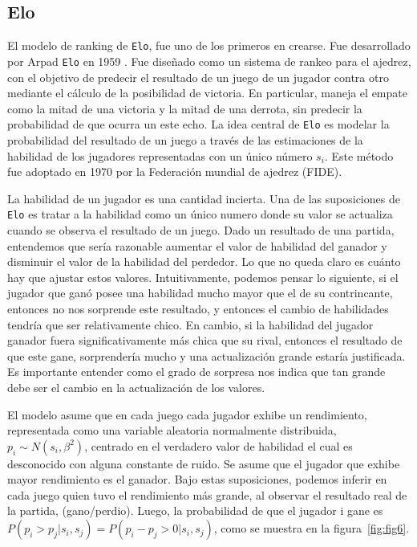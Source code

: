 \documentclass[11pt,twoside, spanish]{report} %
\begin{document}
\subsection{Elo}
El modelo de ranking de \texttt{Elo}, fue uno de los primeros en crearse. Fue desarrollado por Arpad \texttt{Elo} en 1959 \cite{elo1961-uscf}.
Fue dise\~nado como un sistema de rankeo para el ajedrez, con el objetivo de predecir el resultado de un juego de un jugador contra otro mediante el c\'alculo de la posibilidad de victoria.
En particular, maneja el empate como la mitad de una victoria y la mitad de una derrota, sin predecir la probabilidad de que ocurra un este echo.
La idea central de \texttt{Elo} es modelar la probabilidad del resultado de un juego a trav\'es de las estimaciones de la habilidad de los jugadores representadas con un \'unico n\'umero $s_i$.
Este m\'etodo fue adoptado en 1970 por la Federaci\'on mundial de ajedrez (FIDE).


La habilidad de un jugador es una cantidad incierta.
Una de las suposiciones de \texttt{Elo} es tratar a la habilidad como un \'unico numero donde su valor se actualiza cuando se observa el resultado de un juego.
Dado un resultado de una partida, entendemos que ser\'ia razonable aumentar el valor de habilidad del ganador y disminuir el valor de la habilidad del perdedor.
Lo que no queda claro es cu\'anto hay que ajustar estos valores.
Intuitivamente, podemos pensar lo siguiente, si el jugador que gan\'o posee una habilidad mucho mayor que el de su contrincante, entonces no nos sorprende este resultado, y entonces el cambio de habilidades tendr\'ia que ser relativamente chico.
En cambio,  si la habilidad del jugador ganador fuera significativamente m\'as chica que su rival, entonces el resultado de que este gane, sorprender\'ia mucho y una actualizaci\'on grande estar\'ia justificada.
Es importante entender como el grado de sorpresa nos indica que tan grande debe ser el cambio en la actualizaci\'on de los valores.

El modelo asume que en cada juego cada jugador exhibe un rendimiento, representada como una variable aleatoria normalmente distribuida, $p_i\sim N(s_i,\beta^2)$, centrado en el verdadero valor de habilidad el cual es desconocido con alguna constante de ruido.
Se asume que el jugador que exhibe mayor rendimiento es el ganador.
Bajo estas suposiciones, podemos inferir en cada juego quien tuvo el rendimiento m\'as grande, al observar el resultado real de la partida, (gano/perdio).
Luego, la probabilidad de que el jugador i gane es $P(p_i>p_j|s_i,s_j)=P(p_i-p_j>0|s_i,s_j)$, como se muestra en la figura~\ref{fig:fig6}.
\end{document}

